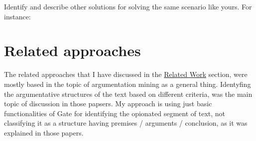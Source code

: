 \documentclass[a4paper,12pt]{report}
\begin{document}
Identify and describe other solutions for solving the same scenario like yours.
For instance: \cite{chesnevar:Survey2000}

\section{Related approaches}

The related approaches that I have discussed in the \hyperref[sec:relw]{Related Work} section, were mostly based in the topic of argumentation mining as a general thing. Identyfing the argumentative structures of the text based on different criteria, was the main topic of discussion in those papsers. My approach is using just basic functionalities of Gate for identifying the opionated segment of text, not classifying it as a structure having premises / arguments / conclusion, as it was explained in those papers.
\end{document}
